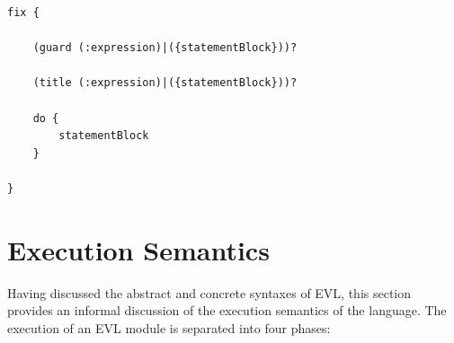 \begin{lstlisting}[basicstyle=\ttfamily\footnotesize, flexiblecolumns=true, numbers=none, nolol=true, caption=Concrete Syntax of an EVL fix, label=lst:FixConcreteSyntax, language=EVL, numbers=left, tabsize=2]
fix {
	
	(guard (:expression)|({statementBlock}))?
	
	(title (:expression)|({statementBlock}))?
	
	do {
		statementBlock
	}
	
}
\end{lstlisting}





\section{Execution Semantics}
\label{sec:Design.EVL.ExecutionSemantics}

Having discussed the abstract and concrete syntaxes of EVL, this section provides an informal discussion of the execution semantics of the language. The execution of an EVL module is separated into four phases:


